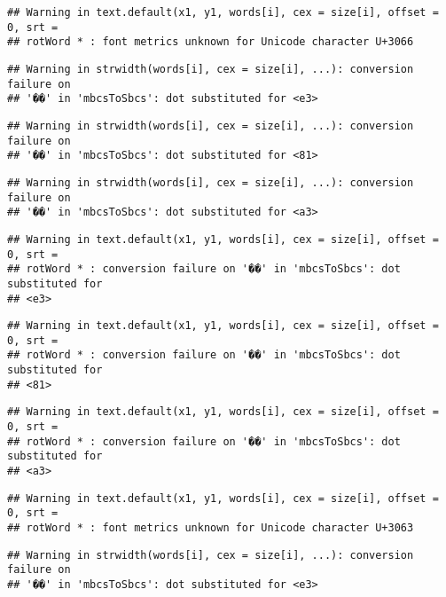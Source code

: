 \documentclass[]{article}
\begin{document}
\begin{verbatim}
## Warning in text.default(x1, y1, words[i], cex = size[i], offset = 0, srt =
## rotWord * : font metrics unknown for Unicode character U+3066
\end{verbatim}

\begin{verbatim}
## Warning in strwidth(words[i], cex = size[i], ...): conversion failure on
## '��' in 'mbcsToSbcs': dot substituted for <e3>
\end{verbatim}

\begin{verbatim}
## Warning in strwidth(words[i], cex = size[i], ...): conversion failure on
## '��' in 'mbcsToSbcs': dot substituted for <81>
\end{verbatim}

\begin{verbatim}
## Warning in strwidth(words[i], cex = size[i], ...): conversion failure on
## '��' in 'mbcsToSbcs': dot substituted for <a3>
\end{verbatim}

\begin{verbatim}
## Warning in text.default(x1, y1, words[i], cex = size[i], offset = 0, srt =
## rotWord * : conversion failure on '��' in 'mbcsToSbcs': dot substituted for
## <e3>
\end{verbatim}

\begin{verbatim}
## Warning in text.default(x1, y1, words[i], cex = size[i], offset = 0, srt =
## rotWord * : conversion failure on '��' in 'mbcsToSbcs': dot substituted for
## <81>
\end{verbatim}

\begin{verbatim}
## Warning in text.default(x1, y1, words[i], cex = size[i], offset = 0, srt =
## rotWord * : conversion failure on '��' in 'mbcsToSbcs': dot substituted for
## <a3>
\end{verbatim}

\begin{verbatim}
## Warning in text.default(x1, y1, words[i], cex = size[i], offset = 0, srt =
## rotWord * : font metrics unknown for Unicode character U+3063
\end{verbatim}

\begin{verbatim}
## Warning in strwidth(words[i], cex = size[i], ...): conversion failure on
## '��' in 'mbcsToSbcs': dot substituted for <e3>
\end{verbatim}
\end{document}
